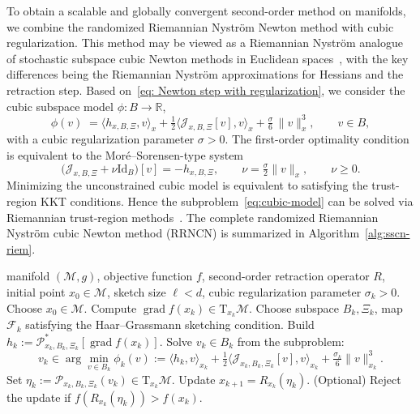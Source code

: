 \documentclass[final,onefignum,onetabnum]{siamart250211}
\DeclareMathOperator{\grad}{grad}
\begin{document}
To obtain a scalable and globally convergent second-order method on manifolds, 
we combine the randomized Riemannian Nystr\"om Newton method with cubic regularization. This method may be viewed as a Riemannian Nystr\"om analogue of stochastic subspace cubic Newton methods in Euclidean spaces~\cite{hanzely2020stochastic}, with the key differences being the Riemannian Nystr\"om approximations for Hessians and the retraction step.
Based on~\eqref{eq: Newton step with regularization}, we consider the cubic subspace model $\phi \colon B\to\mathbb{R}$,
\begin{equation}
\label{eq:cubic-model}
\phi(v)\;=\langle h_{x, B, \Xi}, v\rangle_x + \tfrac{1}{2}\langle \mathcal{J}_{x, B, \Xi} [v], v\rangle_x + \tfrac{\sigma}{6}\,\|v\|_x^{3},\qquad v\in B,
\end{equation}
with a cubic regularization parameter $\sigma>0$.
The first-order optimality condition is equivalent to the Mor\'e--Sorensen-type system~\cite{more1983computing}
\[
\bigl(\mathcal{J}_{x, B, \Xi}+\nu \mathrm{Id}_B\bigr)[v]=-h_{x, B, \Xi},\qquad \nu=\tfrac{\sigma}{2}\|v\|_x,\qquad \nu\ge 0.
\]
Minimizing the unconstrained cubic model is equivalent to satisfying the trust-region KKT conditions. Hence the subproblem~\eqref{eq:cubic-model} can be solved via Riemannian trust-region methods~\cite{boumal2019global}.
The complete randomized Riemannian Nystr\"om cubic Newton method (RRNCN) is summarized in Algorithm~\ref{alg:sscn-riem}. 


\begin{algorithm}[H]
  \caption{Randomized Riemannian Nystr\"om cubic Newton method on $(\mathcal{M},g)$}
  \label{alg:sscn-riem}
  \begin{algorithmic}[1]
  \Require manifold $(\mathcal{M},g)$, objective function $f$, second-order retraction operator $R$, initial point $x_0\in\mathcal{M}$, sketch size $\ell < d$, cubic regularization parameter $\sigma_k>0$.
  \State Choose $x_0\in\mathcal{M}$.
  \State Compute $\grad f(x_k)\in \mathrm{T}_{x_k}\mathcal{M}$.
  \State Choose subspace $B_k, \Xi_k$, map $\mathcal{F}_k$ satisfying the Haar--Grassmann sketching condition.
  \State Build $h_k:=\mathcal{P}_{x_k, B_k, \Xi_k}^* [\grad f(x_k)]$.
  \State Solve $v_k \in B_k$ from the subproblem:\[
  v_k \in \arg\min_{v\in B_k} \phi_k(v) := \langle h_k, v\rangle_{x_k} + \tfrac{1}{2}\langle \mathcal{J}_{x_k, B_k, \Xi_k} [v], v\rangle_{x_k} + \tfrac{\sigma_k}{6}\|v\|_{x_k}^{3}.
  \]
  \State Set $\eta_k:=\mathcal{P}_{x_k, B_k, \Xi_k}(v_k) \in \mathrm{T}_{x_k}\mathcal M$.
  \State Update $x_{k+1}=R_{x_k}(\eta_k)$.
  \State (Optional) Reject the update if $f(R_{x_k}(\eta_k)) > f(x_k)$.
  \EndFor
  \end{algorithmic}
  \end{algorithm}
\end{document}
